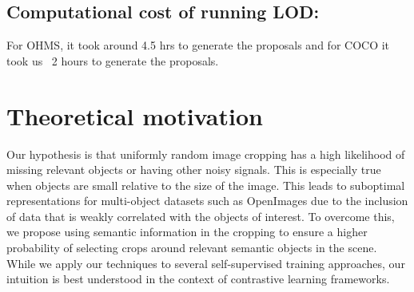 {\subsection{Computational cost of running LOD:}
For OHMS, it took around 4.5 hrs to generate the proposals and for COCO it took us ~2 hours to generate the proposals.}






\section{Theoretical motivation}
Our hypothesis is that uniformly random image cropping has a high likelihood of missing relevant objects or having other noisy signals. This is especially true when objects are small relative to the size of the image. This leads to suboptimal representations for multi-object datasets such as OpenImages due to the inclusion of data that is weakly correlated with the objects of interest. To overcome this, we propose using semantic information in the cropping to ensure a higher probability of selecting crops around relevant  semantic objects in the scene. While we apply our techniques to several self-supervised training approaches, our intuition is best understood in the context of contrastive learning frameworks.  

